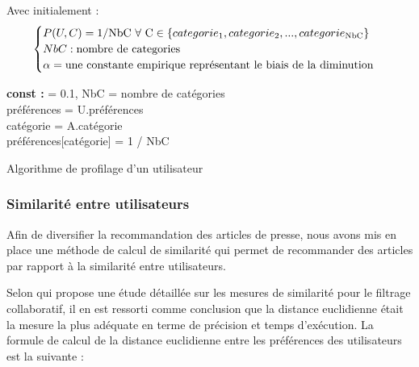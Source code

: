         Avec initialement :\\
        \[
        \begin{cases}
            P(U, C) = 1 / \text{NbC } \forall \text{ C} \in \{categorie\textsubscript{1}, categorie\textsubscript{2}, ..., categorie\textsubscript{NbC}\}\\
            NbC : \text{nombre de categories}\\
            \alpha = \text{une constante empirique représentant le biais de la diminution}
        \end{cases}
        \]
        \begin{algorithm2e}[H]
        \SetAlgoLined
        \textbf{const :} \alpha = 0.1, NbC = nombre de catégories\\
        préférences = U.préférences\\
        catégorie = A.catégorie\\
        {
            préférences[catégorie] = 1 / NbC
        }
        \caption{Algorithme de profilage d'un utilisateur}
        \end{algorithm2e}
        \subsubsection{Similarité entre utilisateurs}
        Afin de diversifier la recommandation des articles de presse, nous avons mis en place une méthode de calcul de similarité qui permet de recommander des articles par rapport à la similarité entre utilisateurs. 

        Selon \cite{euclidepreuve} qui propose une étude détaillée sur les mesures de similarité pour le filtrage collaboratif, il en est ressorti comme conclusion que la distance euclidienne était la mesure la plus adéquate en terme de précision et temps d'exécution. La formule de calcul de la distance euclidienne entre les préférences des utilisateurs est la suivante :

